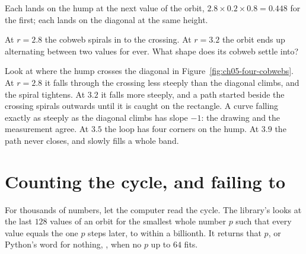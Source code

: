 

\noindent
Each  lands on the hump at the next value of the orbit,
$\num{2.8} \times \num{0.2} \times \num{0.8} = \num{0.448}$ for the first;
each  lands on the diagonal at the same height.

\begin{think}
At $r = \num{2.8}$ the cobweb spirals in to the crossing. At $r = \num{3.2}$
the orbit ends up alternating between two values for ever. What shape does
its cobweb settle into?
\end{think}


\noindent
Look at where the hump crosses the diagonal in
Figure~\ref{fig:ch05-four-cobwebs}. At $r = \num{2.8}$ it falls
through the crossing less steeply than the diagonal climbs, and the spiral
tightens. At $\num{3.2}$ it falls more steeply, and a path started beside
the crossing spirals outwards until it is caught on the rectangle. A curve
falling exactly as steeply as the diagonal climbs has slope $-1$: the
drawing and the measurement agree. At $\num{3.5}$ the loop has four corners on the hump. At
$\num{3.9}$ the path never closes, and slowly fills a whole band.

\section{Counting the cycle, and failing to}
\label{sec:ch05-period}

\noindent
For thousands of numbers, let the computer read the cycle. The library's
 looks at the last $128$ values of an orbit for the smallest
whole number $p$ such that every value equals the one $p$ steps later, to
within a billionth. It returns that $p$, or Python's word for nothing,
, when no $p$ up to $64$ fits.


